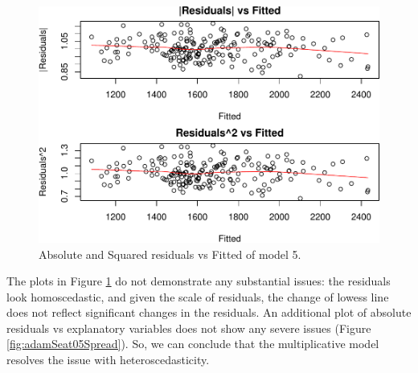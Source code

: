 \documentclass[
]{book}
\newenvironment{Shaded}{\begin{snugshade}}{\end{snugshade}}
\newcommand{\AttributeTok}[1]{\textcolor[rgb]{0.77,0.63,0.00}{#1}}
\newcommand{\ConstantTok}[1]{\textcolor[rgb]{0.00,0.00,0.00}{#1}}
\newcommand{\DecValTok}[1]{\textcolor[rgb]{0.00,0.00,0.81}{#1}}
\newcommand{\FunctionTok}[1]{\textcolor[rgb]{0.00,0.00,0.00}{#1}}
\newcommand{\NormalTok}[1]{#1}
\newcommand{\SpecialCharTok}[1]{\textcolor[rgb]{0.00,0.00,0.00}{#1}}
\theoremstyle{definition}
\theoremstyle{definition}
\theoremstyle{definition}
\theoremstyle{definition}
\theoremstyle{remark}
\begin{document}
\begin{figure}
\centering
\includegraphics{Svetunkov--2022----ADAM_files/figure-latex/adamSeat05HeteroPlot-1.pdf}
\caption{\label{fig:adamSeat05HeteroPlot}Absolute and Squared residuals vs Fitted of model 5.}
\end{figure}

The plots in Figure \ref{fig:adamSeat05HeteroPlot} do not demonstrate any substantial issues: the residuals look homoscedastic, and given the scale of residuals, the change of lowess line does not reflect significant changes in the residuals. An additional plot of absolute residuals vs explanatory variables does not show any severe issues (Figure \ref{fig:adamSeat05Spread}). So, we can conclude that the multiplicative model resolves the issue with heteroscedasticity.

\begin{Shaded}
\end{Shaded}
\end{document}
